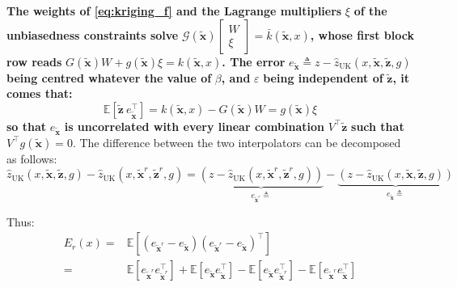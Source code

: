 \documentclass[preprint]{elsarticle}
\begin{document}
\textbf{The weights of \eqref{eq:kriging_f} and the Lagrange multipliers} $\xi$ \textbf{of the unbiasedness constraints solve} $\mathcal{G}(\tilde{\mathbf{x}})\begin{bmatrix}W\\\xi\end{bmatrix}=\bar{k}(\tilde{\mathbf{x}},x)$\textbf{, whose first block row reads} $G(\tilde{\mathbf{x}})W+g(\tilde{\mathbf{x}})\xi=k(\tilde{\mathbf{x}},x)$\textbf{. The error} $e_{\tilde{\mathbf{x}}}\triangleq z-\hat{z}_{\mathrm{UK}}(x,\tilde{\mathbf{x}},\tilde{\mathbf{z}},g)$ \textbf{being centred whatever the value of} $\beta$\textbf{, and} $\varepsilon$ \textbf{being independent of} $\tilde{\mathbf{z}}$\textbf{, it comes that:}
\begin{equation*}
    \mathbb{E}\left[\tilde{\mathbf{z}}\:e_{\tilde{\mathbf{x}}}^\top\right]=k(\tilde{\mathbf{x}},x)-G(\tilde{\mathbf{x}})W=g(\tilde{\mathbf{x}})\xi
\end{equation*}
\textbf{so that} $e_{\tilde{\mathbf{x}}}$ \textbf{is uncorrelated with every linear combination} $V^\top\tilde{\mathbf{z}}$ \textbf{such that} $V^\top g(\tilde{\mathbf{x}})=0$. The difference between the two interpolators can be decomposed as follows:
\begin{equation*}
    \hat{z}_{\mathrm{UK}}(x,\tilde{\mathbf{x}},\tilde{\mathbf{z}},g)-\hat{z}_{\mathrm{UK}}(x,\tilde{\mathbf{x}}^r,\tilde{\mathbf{z}}^r,g)=\underbrace{\left(z-\hat{z}_{\mathrm{UK}}(x,\tilde{\mathbf{x}}^r,\tilde{\mathbf{z}}^r,g)\right)}_{e_{\tilde{\mathbf{x}}^r}\triangleq}-\underbrace{\left(z-\hat{z}_{\mathrm{UK}}(x,\tilde{\mathbf{x}},\tilde{\mathbf{z}},g)\right)}_{e_{\tilde{\mathbf{x}}}\triangleq}
\end{equation*}

Thus:
\begin{equation*}
    \begin{aligned}
    E_r(x)=&\mathbb{E}\left[\left(e_{\tilde{\mathbf{x}}^r}-e_{\tilde{\mathbf{x}}}\right)\left(e_{\tilde{\mathbf{x}}^r}-e_{\tilde{\mathbf{x}}}\right)^\top\right]\\
    =&\mathbb{E}\left[e_{\tilde{\mathbf{x}}^r}e_{\tilde{\mathbf{x}}^r}^\top\right]+\mathbb{E}\left[e_{\tilde{\mathbf{x}}}e_{\tilde{\mathbf{x}}}^\top\right]-\mathbb{E}\left[e_{\tilde{\mathbf{x}}}e_{\tilde{\mathbf{x}}^r}^\top\right]-\mathbb{E}\left[e_{\tilde{\mathbf{x}}^r}e_{\tilde{\mathbf{x}}}^\top\right]
    \end{aligned}
\end{equation*}
\end{document}
